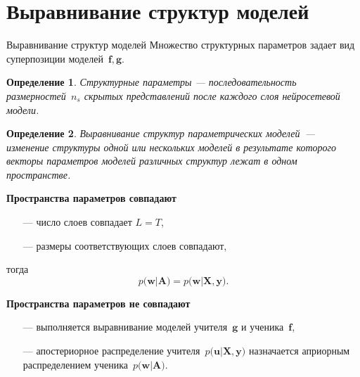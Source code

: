 \documentclass[10pt,pdf,hyperref={unicode}]{beamer}
\newtheorem{rusdefinition}{Определение}
\begin{document}
\section{Выравнивание структур моделей}
\begin{frame}{Выравнивание структур моделей}
Множество структурных параметров задает вид суперпозиции моделей~$\mathbf{f}, \mathbf{g}$.

\begin{rusdefinition}
Структурные параметры --- последовательность размерностей~$n_s$ скрытых представлений после каждого слоя нейросетевой модели.
\end{rusdefinition}

\begin{rusdefinition}
Выравнивание структур параметрических моделей~--- изменение структуры одной или нескольких моделей в результате которого векторы параметров моделей различных структур лежат в одном пространстве.
\end{rusdefinition}


\textbf{Пространства параметров совпадают}
\begin{itemize}
    \item[---] число слоев совпадает $L=T$,
    \item[---] размеры соответствующих слоев совпадают,
\end{itemize}
тогда
\[
p\bigr(\mathbf{w}|\mathbf{A}\bigr) = p\bigr(\mathbf{w}|\mathbf{X}, \mathbf{y}\bigr).
\]

\textbf{Пространства параметров не совпадают}
\begin{itemize}
    \item[---] выполняется выравнивание моделей учителя~$\mathbf{g}$ и ученика~$\mathbf{f}$,
    \item[---] апостериорное распределение учителя~$p\bigr(\mathbf{u}|\mathbf{X}, \mathbf{y}\bigr)$ назначается априорным распределением ученика~$p\bigr(\mathbf{w}|\mathbf{A}\bigr)$.
\end{itemize}

\end{frame}

\end{document}
